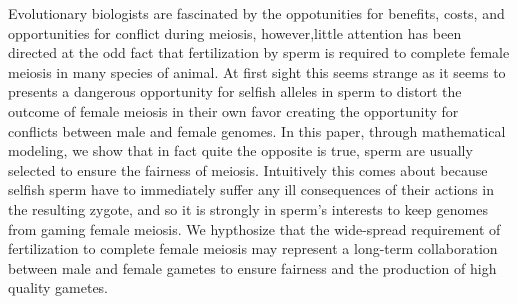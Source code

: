 Evolutionary biologists are fascinated by the oppotunities for benefits, costs, and opportunities for conflict during meiosis, however,little attention has been directed at the odd fact that fertilization by sperm is required to complete female meiosis in many species of animal. At first sight this seems strange as it seems to presents a dangerous opportunity for selfish alleles in sperm to distort the outcome of female meiosis in their own favor creating the opportunity for conflicts between male and female genomes. In this paper, through mathematical modeling, we show that in fact quite the opposite is true, sperm are usually selected to ensure the fairness of meiosis. Intuitively this comes about because selfish sperm have to immediately suffer any ill consequences of their actions in the resulting zygote, and so it is strongly in sperm's interests to keep genomes from gaming female meiosis. We hypthosize that the wide-spread requirement of fertilization to complete female meiosis may represent a long-term collaboration between male and female gametes to ensure fairness and the production of high quality gametes.
